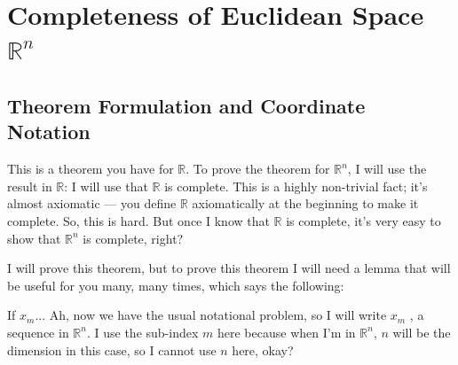 \section{Completeness of Euclidean Space \texorpdfstring{$\mathbb{R}^n$}{R^n}}

\subsection{Theorem Formulation and Coordinate Notation}

\begin{speech}[01:02:42 - 01:04:02]
 This is a theorem you have for $\mathbb{R}$. To prove the theorem for $\mathbb{R}^n$, I will use the result in $\mathbb{R}$: I will use that $\mathbb{R}$ is complete. This is a highly non-trivial fact; it's almost axiomatic --- you define $\mathbb{R}$ axiomatically at the beginning to make it complete. So, this is hard. But once I know that $\mathbb{R}$ is complete, it's very easy to show that $\mathbb{R}^n$ is complete, right?

I will prove this theorem, but to prove this theorem I will need a lemma that will be useful for you many, many times, which says the following: 

If $x_m$... Ah, now we have the usual notational problem, so I will write $x_m$ , a sequence in $\mathbb{R}^n$. I use the sub-index $m$ here because when I'm in $\mathbb{R}^n$, $n$ will be the dimension in this case, so I cannot use $n$ here, okay?
\end{speech}

\begin{content}
\end{content}

